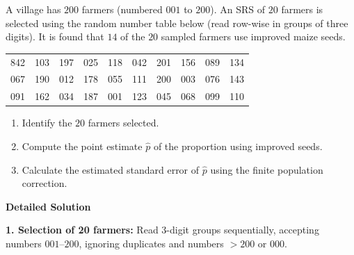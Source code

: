 \documentclass[11pt]{article}
\begin{document}
\begin{exoresolu}
A village has $200$ farmers (numbered $001$ to $200$). An SRS of $20$ farmers is selected using the random number table below (read row-wise in groups of three digits). It is found that $14$ of the $20$ sampled farmers use improved maize seeds.

\begin{center}
\begin{tabular}{cccccccccc}
842 & 103 & 197 & 025 & 118 & 042 & 201 & 156 & 089 & 134 \\
067 & 190 & 012 & 178 & 055 & 111 & 200 & 003 & 076 & 143 \\
091 & 162 & 034 & 187 & 001 & 123 & 045 & 068 & 099 & 110 \\
\end{tabular}
\end{center}

\begin{enumerate}
\item Identify the $20$ farmers selected.
\item Compute the point estimate $\hat{p}$ of the proportion using improved seeds.
\item Calculate the estimated standard error of $\hat{p}$ using the finite population correction.
\end{enumerate}
\tcblower
\textbf{Detailed Solution}

\textbf{1. Selection of 20 farmers:}
Read 3-digit groups sequentially, accepting numbers $001$--$200$, ignoring duplicates and numbers $>200$ or $000$.


\end{exoresolu}
\end{document}
